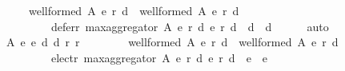 \begin{isabellebody}
\ \ \ \ \ \ \ \ {\isacharparenleft}{\kern0pt}well{\isacharunderscore}{\kern0pt}formed\ A\ {\isacharparenleft}{\kern0pt}e{}{\isacharcomma}{\kern0pt}\ r{}{\isacharcomma}{\kern0pt}\ d{}{\isacharparenright}{\kern0pt}\ {\isasymand}\ well{\isacharunderscore}{\kern0pt}formed\ A\ {\isacharparenleft}{\kern0pt}e{}{\isacharcomma}{\kern0pt}\ r{}{\isacharcomma}{\kern0pt}\ d{}{\isacharparenright}{\kern0pt}{\isacharparenright}{\kern0pt}\ {\isasymlongrightarrow}\isanewline
\ \ \ \ \ \ \ \ \ \ \ \ defer{\isacharunderscore}{\kern0pt}r\ {\isacharparenleft}{\kern0pt}max{\isacharunderscore}{\kern0pt}aggregator\ A\ {\isacharparenleft}{\kern0pt}e{}{\isacharcomma}{\kern0pt}\ r{}{\isacharcomma}{\kern0pt}\ d{}{\isacharparenright}{\kern0pt}\ {\isacharparenleft}{\kern0pt}e{}{\isacharcomma}{\kern0pt}\ r{}{\isacharcomma}{\kern0pt}\ d{}{\isacharparenright}{\kern0pt}{\isacharparenright}{\kern0pt}\ {\isasymsubseteq}\ {\isacharparenleft}{\kern0pt}d{}\ {\isasymunion}\ d{}{\isacharparenright}{\kern0pt}{\isachardoublequoteclose}\isanewline
\ \ \ \ \isamarkupfalse%
\ auto\isanewline
\ \ \isamarkupfalse%
\ \isamarkupfalse%
\isanewline
\ \ \ \ {\isachardoublequoteopen}{\isasymforall}A\ e{}\ e{}\ d{}\ d{}\ r{}\ r{}{\isachardot}{\kern0pt}\isanewline
\ \ \ \ \ \ \ \ {\isacharparenleft}{\kern0pt}well{\isacharunderscore}{\kern0pt}formed\ A\ {\isacharparenleft}{\kern0pt}e{}{\isacharcomma}{\kern0pt}\ r{}{\isacharcomma}{\kern0pt}\ d{}{\isacharparenright}{\kern0pt}\ {\isasymand}\ well{\isacharunderscore}{\kern0pt}formed\ A\ {\isacharparenleft}{\kern0pt}e{}{\isacharcomma}{\kern0pt}\ r{}{\isacharcomma}{\kern0pt}\ d{}{\isacharparenright}{\kern0pt}{\isacharparenright}{\kern0pt}\ {\isasymlongrightarrow}\isanewline
\ \ \ \ \ \ \ \ \ \ \ \ {\isacharparenleft}{\kern0pt}elect{\isacharunderscore}{\kern0pt}r\ {\isacharparenleft}{\kern0pt}max{\isacharunderscore}{\kern0pt}aggregator\ A\ {\isacharparenleft}{\kern0pt}e{}{\isacharcomma}{\kern0pt}\ r{}{\isacharcomma}{\kern0pt}\ d{}{\isacharparenright}{\kern0pt}\ {\isacharparenleft}{\kern0pt}e{}{\isacharcomma}{\kern0pt}\ r{}{\isacharcomma}{\kern0pt}\ d{}{\isacharparenright}{\kern0pt}{\isacharparenright}{\kern0pt}\ {\isasymsubseteq}\ {\isacharparenleft}{\kern0pt}e{}\ {\isasymunion}\ e{}{\isacharparenright}{\kern0pt}\ {\isasymand}\isanewline

\end{isabellebody}

